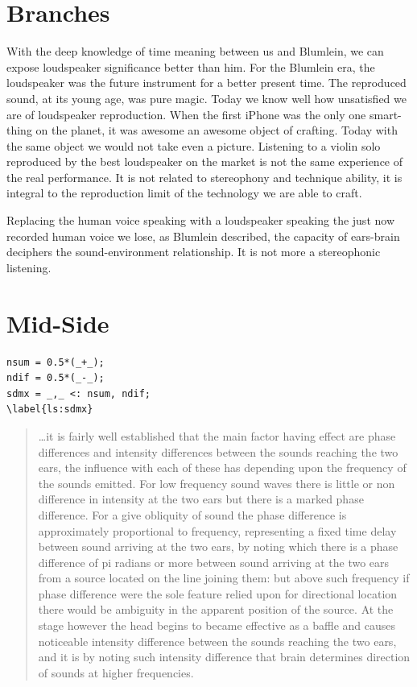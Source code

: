 \documentclass{article}
\begin{document}
\section{Branches}
\label{sec:branches}

With the deep knowledge of time meaning between us and Blumlein, we can expose loudspeaker significance better than him. For the Blumlein era, the loudspeaker was the future instrument for a better present time. The reproduced sound, at its young age, was pure magic. Today we know well how unsatisfied we are of loudspeaker reproduction. When the first iPhone was the only one smart-thing on the planet, it was awesome an awesome object of crafting. Today with the same object we would not take even a picture. Listening to a violin solo reproduced by the best loudspeaker on the market is not the same experience of the real performance. It is not related to stereophony and technique ability, it is integral to the reproduction limit of the technology we are able to craft.

Replacing the human voice speaking with a loudspeaker speaking the just now recorded human voice we lose, as Blumlein described, the capacity of ears-brain deciphers the sound-environment relationship. It is not more a stereophonic listening.

\vfill\null

\newpage

\section{Mid-Side}
\label{sec:midside}

\begin{lstlisting}
nsum = 0.5*(_+_);
ndif = 0.5*(_-_);
sdmx = _,_ <: nsum, ndif;
\label{ls:sdmx}
\end{lstlisting}

\begin{quotation}
…it is fairly well established that the main factor having effect are phase
differences and intensity differences between the sounds reaching the two ears,
the influence with each of these has depending upon the frequency of the sounds
emitted. For low frequency sound waves there is little or non difference in
intensity at the two ears but there is a marked phase difference. For a give
obliquity of sound the phase difference is approximately proportional to
frequency, representing a fixed time delay between sound arriving at the two
ears, by noting which there is a phase difference of pi radians or more between
sound arriving at the two ears from a source located on the line joining them:
but above such frequency if phase difference were the sole feature relied upon
for directional location there would be ambiguity in the apparent position of
the source. At the stage however the head begins to became effective as a baffle
and causes noticeable intensity difference between the sounds reaching the two
ears, and it is by noting such intensity difference that brain determines
direction of sounds at higher frequencies.
\end{quotation}
\end{document}
